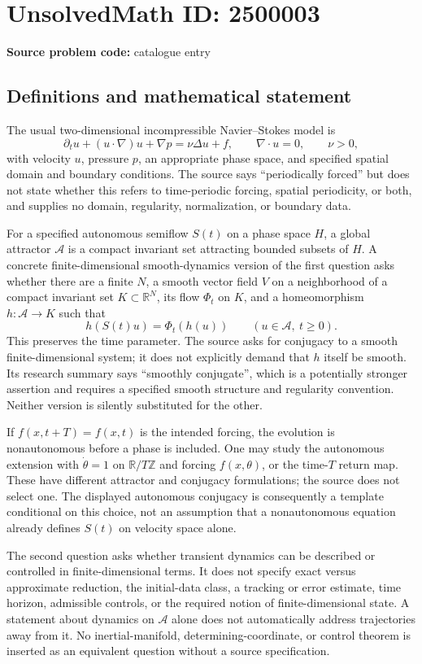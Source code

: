 \documentclass[11pt]{article}
\newcommand{\Z}{\mathbb{Z}}
\newcommand{\R}{\mathbb{R}}
\begin{document}
\section*{UnsolvedMath ID: 2500003}
\textbf{Source problem code:} catalogue entry
\subsection{Definitions and mathematical statement}
The usual two-dimensional incompressible Navier--Stokes model is
\[
\partial_tu+(u\cdot\nabla)u+\nabla p=\nu\Delta u+f,\qquad
\nabla\cdot u=0,\qquad \nu>0,
\]
with velocity $u$, pressure $p$, an appropriate phase space, and specified spatial domain and boundary conditions. The source says ``periodically forced'' but does not state whether this refers to time-periodic forcing, spatial periodicity, or both, and supplies no domain, regularity, normalization, or boundary data.

For a specified autonomous semiflow $S(t)$ on a phase space $H$, a global attractor $\mathcal A$ is a compact invariant set attracting bounded subsets of $H$. A concrete finite-dimensional smooth-dynamics version of the first question asks whether there are a finite $N$, a smooth vector field $V$ on a neighborhood of a compact invariant set $K\subset\R^N$, its flow $\Phi_t$ on $K$, and a homeomorphism $h:\mathcal A\to K$ such that
\[
h(S(t)u)=\Phi_t(h(u))\qquad(u\in\mathcal A,\ t\ge0).
\]
This preserves the time parameter. The source asks for conjugacy to a smooth finite-dimensional system; it does not explicitly demand that $h$ itself be smooth. Its research summary says ``smoothly conjugate'', which is a potentially stronger assertion and requires a specified smooth structure and regularity convention. Neither version is silently substituted for the other.

If $f(x,t+T)=f(x,t)$ is the intended forcing, the evolution is nonautonomous before a phase is included. One may study the autonomous extension with $\dot\theta=1$ on $\R/T\Z$ and forcing $f(x,\theta)$, or the time-$T$ return map. These have different attractor and conjugacy formulations; the source does not select one. The displayed autonomous conjugacy is consequently a template conditional on this choice, not an assumption that a nonautonomous equation already defines $S(t)$ on velocity space alone.

The second question asks whether transient dynamics can be described or controlled in finite-dimensional terms. It does not specify exact versus approximate reduction, the initial-data class, a tracking or error estimate, time horizon, admissible controls, or the required notion of finite-dimensional state. A statement about dynamics on $\mathcal A$ alone does not automatically address trajectories away from it. No inertial-manifold, determining-coordinate, or control theorem is inserted as an equivalent question without a source specification.
\end{document}
